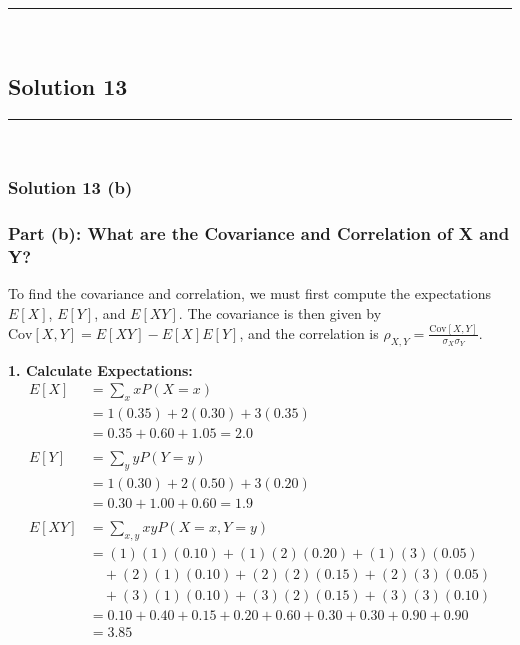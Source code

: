\documentclass{article}
\begin{document}
\noindent\rule{\textwidth}{0.4pt}\\

\newpage

\subsection*{Solution 13}
\noindent\rule{\textwidth}{0.4pt}\\
\subsubsection*{Solution  13 (b)}

\subsubsection*{Part (b): What are the Covariance and Correlation of X and Y?}

\parbox{\textwidth}{
To find the covariance and correlation, we must first compute the expectations $E[X]$, $E[Y]$, and $E[XY]$. The covariance is then given by $\text{Cov}[X, Y] = E[XY] - E[X]E[Y]$, and the correlation is $\rho_{X, Y} = \frac{\text{Cov}[X, Y]}{\sigma_X \sigma_Y}$.
}
\vspace{1em}

\textbf{1. Calculate Expectations:}
\begin{align*}
    E[X] &= \sum_{x} x P(X=x) \\
         &= 1(0.35) + 2(0.30) + 3(0.35) \\
         &= 0.35 + 0.60 + 1.05 = \mathbf{2.0} \\
    \\
    E[Y] &= \sum_{y} y P(Y=y) \\
         &= 1(0.30) + 2(0.50) + 3(0.20) \\
         &= 0.30 + 1.00 + 0.60 = \mathbf{1.9} \\
    \\
    E[XY] &= \sum_{x,y} xy P(X=x, Y=y) \\
          &= (1)(1)(0.10) + (1)(2)(0.20) + (1)(3)(0.05) \\
          &\quad + (2)(1)(0.10) + (2)(2)(0.15) + (2)(3)(0.05) \\
          &\quad + (3)(1)(0.10) + (3)(2)(0.15) + (3)(3)(0.10) \\
          &= 0.10 + 0.40 + 0.15 + 0.20 + 0.60 + 0.30 + 0.30 + 0.90 + 0.90 \\
          &= \mathbf{3.85}
\end{align*}
\end{document}
